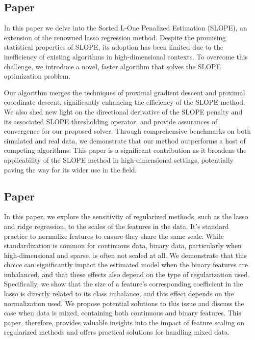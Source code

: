 \subsection{Paper \V}

In this paper we delve into the Sorted L-One Penalized Estimation (SLOPE), an extension of the renowned lasso regression method. Despite the promising statistical properties of SLOPE, its adoption has been limited due to the inefficiency of existing algorithms in high-dimensional contexts. To overcome this challenge, we introduce a novel, faster algorithm that solves the SLOPE optimization problem.

Our algorithm merges the techniques of proximal gradient descent and proximal coordinate descent, significantly enhancing the efficiency of the SLOPE method. We also shed new light on the directional derivative of the SLOPE penalty and its associated SLOPE thresholding operator, and provide assurances of convergence for our proposed solver. Through comprehensive benchmarks on both simulated and real data, we demonstrate that our method outperforms a host of competing algorithms. This paper is a significant contribution as it broadens the applicability of the SLOPE method in high-dimensional settings, potentially paving the way for its wider use in the field.

\subsection{Paper \VI}

In this paper, we explore the sensitivity of regularized methods, such as the lasso and ridge regression, to the scales of the features in the data. It's standard practice to normalize features to ensure they share the same scale. While standardization is common for continuous data, binary data, particularly when high-dimensional and sparse, is often not scaled at all. We demonstrate that this choice can significantly impact the estimated model when the binary features are imbalanced, and that these effects also depend on the type of regularization used. Specifically, we show that the size of a feature's corresponding coefficient in the lasso is directly related to its class imbalance, and this effect depends on the normalization used. We propose potential solutions to this issue and discuss the case when data is mixed, containing both continuous and binary features. This paper, therefore, provides valuable insights into the impact of feature scaling on regularized methods and offers practical solutions for handling mixed data.
